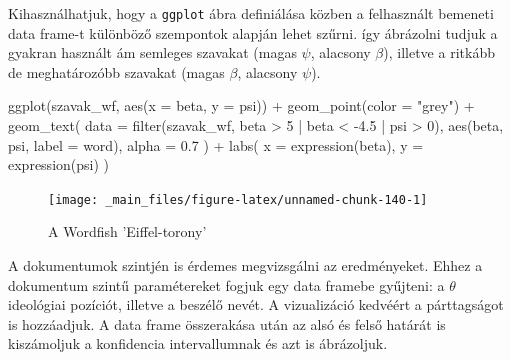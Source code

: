 \documentclass[
]{book}
\newenvironment{Shaded}{\begin{snugshade}}{\end{snugshade}}
\newcommand{\AttributeTok}[1]{\textcolor[rgb]{0.77,0.63,0.00}{#1}}
\newcommand{\DecValTok}[1]{\textcolor[rgb]{0.00,0.00,0.81}{#1}}
\newcommand{\FloatTok}[1]{\textcolor[rgb]{0.00,0.00,0.81}{#1}}
\newcommand{\FunctionTok}[1]{\textcolor[rgb]{0.00,0.00,0.00}{#1}}
\newcommand{\NormalTok}[1]{#1}
\newcommand{\SpecialCharTok}[1]{\textcolor[rgb]{0.00,0.00,0.00}{#1}}
\newcommand{\StringTok}[1]{\textcolor[rgb]{0.31,0.60,0.02}{#1}}
\begin{document}
Kihasználhatjuk, hogy a \texttt{ggplot} ábra definiálása közben a
felhasznált bemeneti data frame-t különböző szempontok alapján lehet
szűrni. így ábrázolni tudjuk a gyakran használt ám semleges szavakat
(magas \(\psi\), alacsony \(\beta\)), illetve a ritkább de meghatározóbb
szavakat (magas \(\beta\), alacsony \(\psi\)).

\begin{Shaded}
\begin{Highlighting}[]
\FunctionTok{ggplot}\NormalTok{(szavak\_wf, }\FunctionTok{aes}\NormalTok{(}\AttributeTok{x =}\NormalTok{ beta, }\AttributeTok{y =}\NormalTok{ psi)) }\SpecialCharTok{+}
  \FunctionTok{geom\_point}\NormalTok{(}\AttributeTok{color =} \StringTok{"grey"}\NormalTok{) }\SpecialCharTok{+}
  \FunctionTok{geom\_text}\NormalTok{(}
    \AttributeTok{data =} \FunctionTok{filter}\NormalTok{(szavak\_wf, beta }\SpecialCharTok{\textgreater{}} \DecValTok{5} \SpecialCharTok{|}\NormalTok{ beta }\SpecialCharTok{\textless{}} \SpecialCharTok{{-}}\FloatTok{4.5} \SpecialCharTok{|}\NormalTok{ psi }\SpecialCharTok{\textgreater{}} \DecValTok{0}\NormalTok{),}
    \FunctionTok{aes}\NormalTok{(beta, psi, }\AttributeTok{label =}\NormalTok{ word),}
    \AttributeTok{alpha =} \FloatTok{0.7}
\NormalTok{  ) }\SpecialCharTok{+}
  \FunctionTok{labs}\NormalTok{(}
    \AttributeTok{x =} \FunctionTok{expression}\NormalTok{(beta),}
    \AttributeTok{y =} \FunctionTok{expression}\NormalTok{(psi)}
\NormalTok{  )}
\end{Highlighting}
\end{Shaded}

\begin{figure}

{\centering \texttt{[image: \_main\_files/figure-latex/unnamed-chunk-140-1]} 

}

\caption{A Wordfish 'Eiffel-torony'}\label{fig:unnamed-chunk-140}
\end{figure}

A dokumentumok szintjén is érdemes megvizsgálni az eredményeket. Ehhez a
dokumentum szintű paramétereket fogjuk egy data framebe gyűjteni: a
\(\theta\) ideológiai pozíciót, illetve a beszélő nevét. A vizualizáció
kedvéért a párttagságot is hozzáadjuk. A data frame összerakása után az
alsó és felső határát is kiszámoljuk a konfidencia intervallumnak és azt
is ábrázoljuk.
\end{document}
